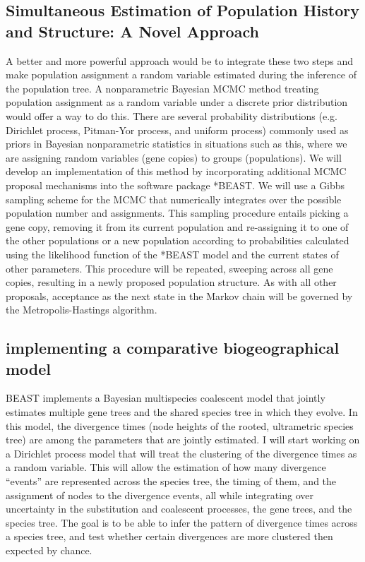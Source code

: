 \documentclass[10pt]{article}
\begin{document}
\subsection*{Simultaneous Estimation of Population History and Structure: A Novel Approach}
A better and more powerful approach would be to integrate these two steps and make population assignment a random variable estimated during the inference of the population tree.
A nonparametric Bayesian MCMC method treating population assignment as a random variable under a discrete prior distribution would offer a way to do this.
There are several probability distributions (e.g. Dirichlet process, Pitman-Yor process, and uniform process) commonly used as priors in Bayesian nonparametric statistics in situations such as this, where we are assigning random variables (gene copies) to groups (populations).
We will develop an implementation of this method by incorporating additional MCMC proposal mechanisms into the software package *BEAST.
We will use a Gibbs sampling scheme for the MCMC that numerically integrates over the possible population number and assignments.
This sampling procedure entails picking a gene copy, removing it from its current population and re-assigning it to one of the other populations or a new population according to probabilities calculated using the likelihood function of the *BEAST model and the current states of other parameters.
This procedure will be repeated, sweeping across all gene copies, resulting in a newly proposed population structure.
As with all other proposals, acceptance as the next state in the Markov chain will be governed by the Metropolis-Hastings algorithm.

\subsection*{implementing a comparative biogeographical model}
BEAST implements a Bayesian multispecies coalescent model that jointly estimates multiple gene trees and the shared species tree in which they evolve.
In this model, the divergence times (node heights of the rooted, ultrametric species tree) are among the parameters that are jointly estimated.
I will start working on a Dirichlet process model that will treat the clustering of the divergence times as a random variable.
This will allow the estimation of how many divergence ``events'' are represented across the species tree, the timing of them, and the assignment of nodes to the divergence events, all while integrating over uncertainty in the substitution and coalescent processes, the gene trees, and the species tree.
The goal is to be able to infer the pattern of divergence times across a species tree, and test whether certain divergences are more clustered then expected by chance.
\end{document}

